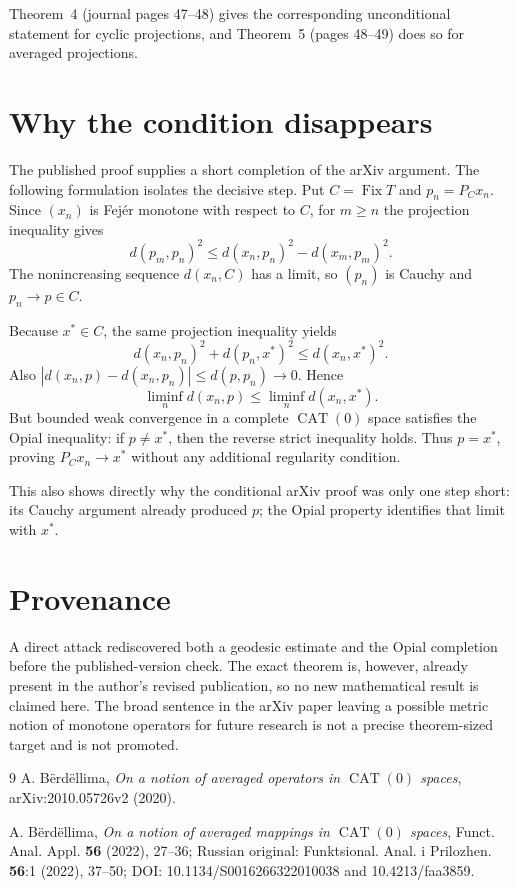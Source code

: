 \documentclass[11pt]{article}
\begin{document}
Theorem~4 (journal pages 47--48) gives the corresponding unconditional
statement for cyclic projections, and Theorem~5 (pages 48--49) does so
for averaged projections.

\section{Why the condition disappears}

The published proof supplies a short completion of the arXiv argument.
The following formulation isolates the decisive step.  Put
$C=\operatorname{Fix}T$ and $p_n=P_Cx_n$.  Since $(x_n)$ is Fej\'er
monotone with respect to $C$, for $m\ge n$ the projection inequality
gives
\[
 d(p_m,p_n)^2
 \le d(x_n,p_n)^2-d(x_m,p_m)^2.
\]
The nonincreasing sequence $d(x_n,C)$ has a limit, so $(p_n)$ is Cauchy
and $p_n\to p\in C$.

Because $x^*\in C$, the same projection inequality yields
\[
 d(x_n,p_n)^2+d(p_n,x^*)^2\le d(x_n,x^*)^2.
\]
Also
$|d(x_n,p)-d(x_n,p_n)|\le d(p,p_n)\to0$.  Hence
\[
 \liminf_n d(x_n,p)\le \liminf_n d(x_n,x^*).
\]
But bounded weak convergence in a complete $\operatorname{CAT}(0)$
space satisfies the Opial inequality: if $p\ne x^*$, then the reverse
strict inequality holds.  Thus $p=x^*$, proving
$P_Cx_n\to x^*$ without any additional regularity condition.

This also shows directly why the conditional arXiv proof was only one
step short: its Cauchy argument already produced $p$; the Opial property
identifies that limit with $x^*$.

\section{Provenance}

A direct attack rediscovered both a geodesic estimate and the Opial
completion before the published-version check.  The exact theorem is,
however, already present in the author's revised publication, so no new
mathematical result is claimed here.  The broad sentence in the arXiv
paper leaving a possible metric notion of monotone operators for future
research is not a precise theorem-sized target and is not promoted.

\begin{thebibliography}{9}
A. B\"erd\"ellima,
\emph{On a notion of averaged operators in $\operatorname{CAT}(0)$ spaces},
arXiv:2010.05726v2 (2020).

A. B\"erd\"ellima,
\emph{On a notion of averaged mappings in $\operatorname{CAT}(0)$ spaces},
Funct. Anal. Appl. \textbf{56} (2022), 27--36;
Russian original: Funktsional. Anal. i Prilozhen. \textbf{56}:1 (2022),
37--50; DOI: 10.1134/S0016266322010038 and 10.4213/faa3859.
\end{thebibliography}
\end{document}
